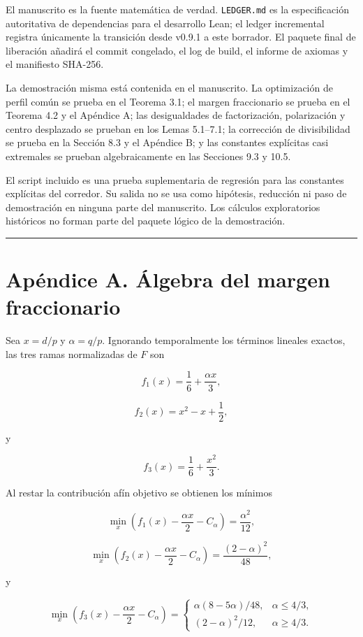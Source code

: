 \documentclass[
  11pt,
]{article}
\begin{document}
El manuscrito es la fuente matemática de verdad. \texttt{LEDGER.md} es
la especificación autoritativa de dependencias para el desarrollo Lean;
el ledger incremental registra únicamente la transición desde v0.9.1 a
este borrador. El paquete final de liberación añadirá el commit
congelado, el log de build, el informe de axiomas y el manifiesto
SHA-256.

La demostración misma está contenida en el manuscrito. La optimización
de perfil común se prueba en el Teorema 3.1; el margen fraccionario se
prueba en el Teorema 4.2 y el Apéndice A; las desigualdades de
factorización, polarización y centro desplazado se prueban en los Lemas
5.1--7.1; la corrección de divisibilidad se prueba en la Sección 8.3 y
el Apéndice B; y las constantes explícitas casi extremales se prueban
algebraicamente en las Secciones 9.3 y 10.5.

El script incluido es una prueba suplementaria de regresión para las
constantes explícitas del corredor. Su salida no se usa como hipótesis,
reducción ni paso de demostración en ninguna parte del manuscrito. Los
cálculos exploratorios históricos no forman parte del paquete lógico de
la demostración.

\begin{center}\rule{0.5\linewidth}{0.5pt}\end{center}

\section{Apéndice A. Álgebra del margen
fraccionario}\label{apuxe9ndice-a.-uxe1lgebra-del-margen-fraccionario}

Sea \(x=d/p\) y \(\alpha=q/p\). Ignorando temporalmente los términos
lineales exactos, las tres ramas normalizadas de \(F\) son

\[
f_1(x)=\frac16+\frac{\alpha x}{3},
\]

\[
f_2(x)=x^2-x+\frac12,
\]

y

\[
f_3(x)=\frac16+\frac{x^2}{3}.
\]

Al restar la contribución afín objetivo se obtienen los mínimos

\[
\min_x\left(f_1(x)-\frac{\alpha x}{2}-C_\alpha\right)
=
\frac{\alpha^2}{12},
\]

\[
\min_x\left(f_2(x)-\frac{\alpha x}{2}-C_\alpha\right)
=
\frac{(2-\alpha)^2}{48},
\]

y

\[
\min_x\left(f_3(x)-\frac{\alpha x}{2}-C_\alpha\right)
=
\begin{cases}
\alpha(8-5\alpha)/48,&\alpha\le4/3,\\
(2-\alpha)^2/12,&\alpha\ge4/3.
\end{cases}
\]
\end{document}
